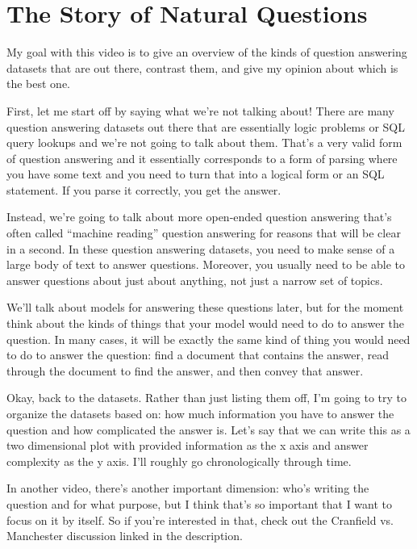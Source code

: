 \label{chapter:nq}

\section{The Story of Natural Questions}

My goal with this video is to give an overview of the kinds of question answering datasets that are out there, contrast them, and give my opinion about which is the best one.

First, let me start off by saying what we're not talking about!  There are many question answering datasets out there that are essentially logic problems or SQL query lookups and we're not going to talk about them.  That's a very valid form of question answering and it essentially corresponds to a form of parsing where you have some text and you need to turn that into a logical form or an SQL statement.  If you parse it correctly, you get the answer.

Instead, we're going to talk about more open-ended question answering that’s often called “machine reading” question answering for reasons that will be clear in a second.  In these question answering datasets, you need to make sense of a large body of text to answer questions.  Moreover, you usually need to be able to answer questions about just about anything, not just a narrow set of topics.

We'll talk about models for answering these questions later, but for the moment think about the kinds of things that your model would need to do to answer the question.  In many cases, it will be exactly the same kind of thing you would need to do to answer the question: find a document that contains the answer, read through the document to find the answer, and then convey that answer.

Okay, back to the datasets.  Rather than just listing them off, I’m going to try to organize the datasets based on: how much information you have to answer the question and how complicated the answer is.  Let’s say that we can write this as a two dimensional plot with provided information as the x axis and answer complexity as the y axis.  I’ll roughly go chronologically through time.

In another video, there’s another important dimension: who’s writing the question and for what purpose, but I think that’s so important that I want to focus on it by itself.  So if you’re interested in that, check out the Cranfield vs. Manchester discussion linked in the description. 


